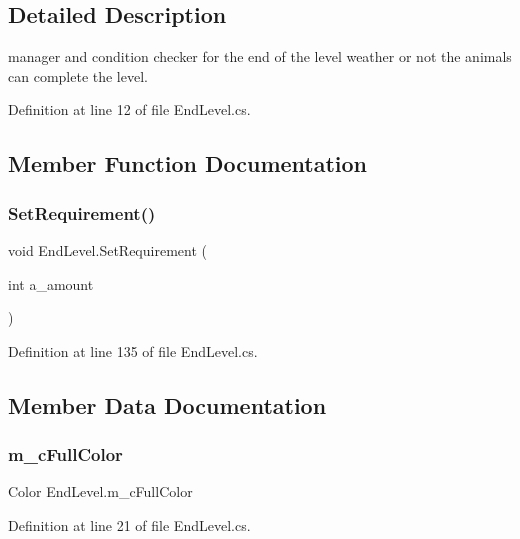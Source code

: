 \subsection{Detailed Description}
manager and condition checker for the end of the level weather or not the animals can complete the level. 



Definition at line 12 of file End\+Level.\+cs.



\subsection{Member Function Documentation}
\mbox{\label{class_end_level_ac48a9108348a9c62626414ee6f67904e}} 
\subsubsection{\texorpdfstring{Set\+Requirement()}{SetRequirement()}}
{\footnotesize\ttfamily void End\+Level.\+Set\+Requirement (\begin{DoxyParamCaption}\item[{int}]{a\+\_\+amount }\end{DoxyParamCaption})}



Definition at line 135 of file End\+Level.\+cs.



\subsection{Member Data Documentation}
\mbox{\label{class_end_level_a8ec4e8037b14d41af57ac898663cda1b}} 
\subsubsection{\texorpdfstring{m\+\_\+c\+Full\+Color}{m\_cFullColor}}
{\footnotesize\ttfamily Color End\+Level.\+m\+\_\+c\+Full\+Color}



Definition at line 21 of file End\+Level.\+cs.

